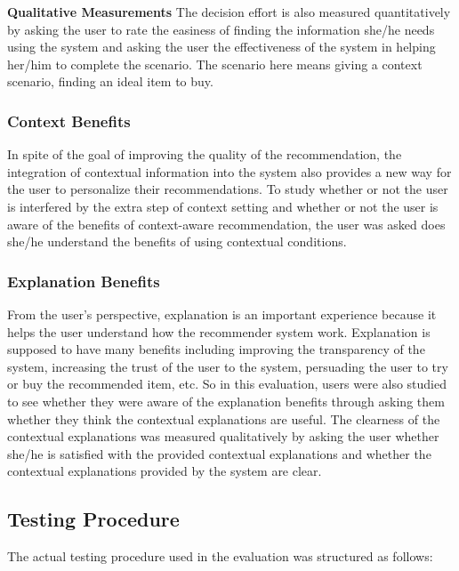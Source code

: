 \textbf{Qualitative Measurements} The decision effort is also measured quantitatively by asking the user to rate the easiness of finding the information she/he needs using the system and asking the user the effectiveness of the system in helping her/him to complete the scenario. The scenario here means giving a context scenario, finding an ideal item to buy.

\subsubsection{Context Benefits} \label{sec:ts_tf_cb}

In spite of the goal of improving the quality of the recommendation, the integration of contextual information into the system also provides a new way for the user to personalize their recommendations. To study whether or not the user is interfered by the extra step of context setting and whether or not the user is aware of the benefits of context-aware recommendation, the user was asked does she/he understand the benefits of using contextual conditions.

\subsubsection{Explanation Benefits} \label{sec:ts_tf_eb}

From the user's perspective, explanation is an important experience because it helps the user understand how the recommender system work. Explanation is supposed to have many benefits including improving the transparency of the system, increasing the trust of the user to the system, persuading the user to try or buy the recommended item, etc. So in this evaluation, users were also studied to see whether they were aware of the explanation benefits through asking them whether they think the contextual explanations are useful. The clearness of the contextual explanations was measured qualitatively by asking the user whether she/he is satisfied with the provided contextual explanations and whether the contextual explanations provided by the system are clear.

\subsection{Testing Procedure} \label{sec:ts_tp}

The actual testing procedure used in the evaluation was structured as follows:

